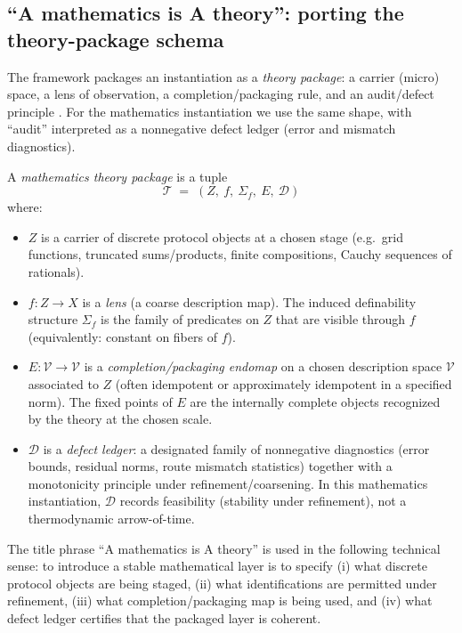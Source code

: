 \subsection{``A mathematics is A theory'': porting the theory-package schema}
The framework packages an instantiation as a \emph{theory package}: a carrier (micro) space, a lens of observation, a completion/packaging rule, and an audit/defect principle \cite{SixBirdsFramework}.
For the mathematics instantiation we use the same shape, with ``audit'' interpreted as a nonnegative defect ledger (error and mismatch diagnostics).

\begin{definition}\label{def:math-theory-package}
A \emph{mathematics theory package} is a tuple
\[
\mathcal T \;=\; (Z,\ f,\ \Sigma_f,\ E,\ \mathcal D)
\]
where:
\begin{itemize}
  \item $Z$ is a carrier of discrete protocol objects at a chosen stage (e.g.\ grid functions, truncated sums/products, finite compositions, Cauchy sequences of rationals).
  \item $f:Z\to X$ is a \emph{lens} (a coarse description map). The induced definability structure $\Sigma_f$ is the family of predicates on $Z$ that are visible through $f$ (equivalently: constant on fibers of $f$).
  \item $E:\mathcal V\to\mathcal V$ is a \emph{completion/packaging endomap} on a chosen description space $\mathcal V$ associated to $Z$ (often idempotent or approximately idempotent in a specified norm). The fixed points of $E$ are the internally complete objects recognized by the theory at the chosen scale.
  \item $\mathcal D$ is a \emph{defect ledger}: a designated family of nonnegative diagnostics (error bounds, residual norms, route mismatch statistics) together with a monotonicity principle under refinement/coarsening. In this mathematics instantiation, $\mathcal D$ records feasibility (stability under refinement), not a thermodynamic arrow-of-time.
\end{itemize}
\end{definition}

\begin{remark}[Slogan]\label{rem:math-is-theory}
The title phrase ``A mathematics is A theory'' is used in the following technical sense:
to introduce a stable mathematical layer is to specify (i) what discrete protocol objects are being staged, (ii) what identifications are permitted under refinement, (iii) what completion/packaging map is being used, and (iv) what defect ledger certifies that the packaged layer is coherent.
\end{remark}

